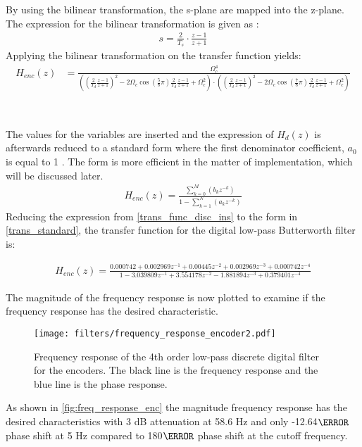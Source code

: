By using the bilinear transformation, the s-plane are mapped into the z-plane. The expression for the bilinear transformation is given as \citep[p. 528]{oppenheim}:
\begin{align}
s = \frac{2}{T_s}\cdot \frac{z-1}{z+1}
\label{bilinear_trans2}
\end{align}
Applying the bilinear transformation on the transfer function yields:
\begin{align}
H_{enc}(z) &= \frac{\Omega_c^4}{((\frac{2}{T_d}\frac{z-1}{z+1})^2 - 2\Omega_c \cos (\frac{5}{8} \pi)\frac{2}{T_d}\frac{z-1}{z+1} + \Omega_c^2) \cdot ((\frac{2}{T_d}\frac{z-1}{z+1})^2 - 2\Omega_c \cos (\frac{7}{8} \pi)\frac{2}{T_d}\frac{z-1}{z+1} + \Omega_c^2)}
\label{trans_func_disc_ins}
\end{align}
\begin{where}
\\
\end{where}

The values for the variables are inserted and the expression of $H_d(z)$ is afterwards reduced to a standard form where the first denominator coefficient, $a_0$ is equal to 1 \citep[p. 456]{oppenheim}. The form is more efficient in the matter of implementation, which will be discussed later.
\begin{align}
H_{enc}(z) = \frac{\sum\limits_{k=0}^{M}(b_kz^{-k})}{1 - \sum\limits_{k=1}^{N}(a_kz^{-k})} 
\label{trans_standard}
\end{align}
Reducing the expression from \autoref{trans_func_disc_ins} to the form in \autoref{trans_standard}, the transfer function for the digital low-pass Butterworth filter is:

\begin{align}
H_{enc}(z) = \frac{0.000742+0.002969z^{-1}+0.00445z^{-2}+0.002969z^{-3}+0.000742z^{-4}}{1-3.039809z^{-1}+3.554178z^{-2}-1.881894z^{-3}+0.379401z^{-4}}
\label{transfer_func_enc}
\end{align}

The magnitude of the frequency response is now plotted to examine if the frequency response has the desired characteristic.

\begin{figure}[H]
    \centering
    \texttt{[image: filters/frequency\_response\_encoder2.pdf]}
    \caption{Frequency response of the 4th order low-pass discrete digital filter for the encoders. The black line is the frequency response and the blue line is the phase response.}
    \label{fig:freq_response_enc}
\end{figure} 
As shown in \autoref{fig:freq_response_enc} the magnitude frequency response has the desired characteristics with 3 dB attenuation at 58.6 Hz and only -12.64$\degree$ phase shift at 5 Hz compared to 180$\degree$ phase shift at the cutoff frequency.

